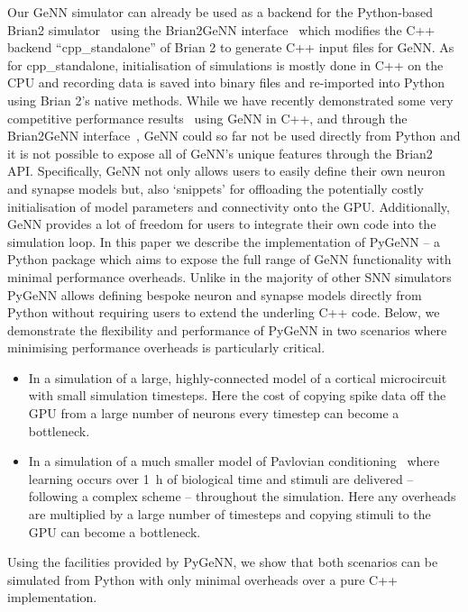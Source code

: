 \documentclass[utf8]{frontiersSCNS} %
\begin{document}
Our GeNN simulator can already be used as a backend for the Python-based Brian2 simulator~\citep{Stimberg2019} using the Brian2GeNN interface~\citep{Stimberg2020} which modifies the C++ backend ``cpp\_standalone'' of Brian 2 to generate C++ input files for GeNN. As for cpp\_standalone, initialisation of simulations is mostly done in C++ on the CPU and recording data is saved into binary files and re-imported into Python using Brian 2's native methods.
While we have recently demonstrated some very competitive performance results~\citep{Knight2018,Knight2020} using GeNN in C++, and through the Brian2GeNN interface~\citep{Stimberg2020}, GeNN could so far not be used directly from Python and it is not possible to expose all of GeNN's unique features through the Brian2 API.
Specifically, GeNN not only allows users to easily define their own neuron and synapse models but, also `snippets' for offloading the potentially costly initialisation of model parameters and connectivity onto the GPU.
Additionally, GeNN  provides a lot of freedom for users to integrate their own code into the simulation loop.
In this paper we describe the implementation of PyGeNN -- a Python package which aims to expose the full range of GeNN functionality with minimal performance overheads.
Unlike in the majority of other SNN simulators PyGeNN allows defining bespoke neuron and synapse models directly from Python without requiring users to extend the underling C++ code.
Below, we demonstrate the flexibility and performance of PyGeNN in two scenarios where minimising performance overheads is particularly critical.
\begin{itemize}
    \item In a simulation of a large, highly-connected model of a cortical microcircuit~\citep{Potjans2012} with small simulation timesteps. Here the cost of copying spike data off the GPU from a large number of neurons every timestep can become a bottleneck.
    \item In a simulation of a much smaller model of Pavlovian conditioning~\citep{Izhikevich2007} where learning occurs over \SI{1}{\hour} of biological time and stimuli are delivered -- following a complex scheme -- throughout the simulation. Here any overheads are multiplied by a large number of timesteps and copying stimuli to the GPU can become a bottleneck.
\end{itemize}
Using the facilities provided by PyGeNN, we show that both scenarios can be simulated from Python with only minimal overheads over a pure C++ implementation.
\end{document}
